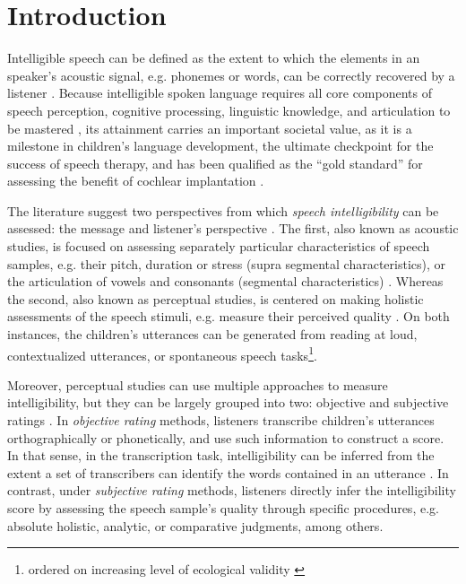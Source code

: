 \section{Introduction}

Intelligible speech can be defined as the extent to which the elements in an speaker's acoustic signal, e.g. phonemes or words, can be correctly recovered by a listener \citep{Kent_et_al_1989, Whitehill_et_al_2004, vanHeuven_2008, Freeman_et_al_2017}. Because intelligible spoken language requires all core components of speech perception, cognitive processing, linguistic knowledge, and articulation to be mastered \citep{Freeman_et_al_2017}, its attainment carries an important societal value, as it is a milestone in children's language development, the ultimate checkpoint for the success of speech therapy, and has been qualified as the ``gold standard'' for assessing the benefit of cochlear implantation \citep{Chin_et_al_2012}. 

The literature suggest two perspectives from which \textit{speech intelligibility} can be assessed: the message and listener's perspective \citep{Boonen_et_al_2020, Boonen_et_al_2021}. The first, also known as acoustic studies, is focused on assessing separately particular characteristics of speech samples, e.g. their pitch, duration or stress (supra segmental characteristics), or the articulation of vowels and consonants (segmental characteristics) \citep{Rowe_et_al_2018}. Whereas the second, also known as perceptual studies, is centered on making holistic assessments of the speech stimuli, e.g. measure their perceived quality \citep{Boonen_et_al_2020, Boonen_et_al_2021}. On both instances, the children's utterances can be generated from reading at loud, contextualized utterances, or spontaneous speech tasks\footnote{ordered on increasing level of ecological validity \citep{Flipsen_2006,Ertmer_2011}}.

\begin{comment}
Based on their description, it seems that perceptual are more subjective than acoustic studies, as they do not rely on "objective" measurements, i.e. time duration, wave amplitude, among others, available in the former. However, for the case of SI, there are objective and subjective assessment methodologies.
\end{comment}

Moreover, perceptual studies can use multiple approaches to measure intelligibility, but they can be largely grouped into two: objective and subjective ratings \citep{Hustad_et_al_2020}. In \textit{objective rating} methods, listeners transcribe children's utterances orthographically or phonetically, and use such information to construct a score. In that sense, in the transcription task, intelligibility can be inferred from the extent a set of transcribers can identify the words contained in an utterance \cite{Boonen_et_al_2021}. In contrast, under \textit{subjective rating} methods, listeners directly infer the intelligibility score by assessing the speech sample's quality through specific procedures, e.g. absolute holistic, analytic, or comparative judgments, among others. 

